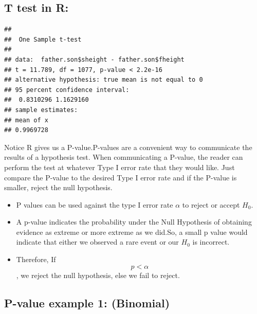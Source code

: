 \documentclass[]{article}
\newenvironment{Shaded}{\begin{snugshade}}{\end{snugshade}}
\newcommand{\KeywordTok}[1]{\textcolor[rgb]{0.13,0.29,0.53}{\textbf{#1}}}
\newcommand{\NormalTok}[1]{#1}
\newcommand{\OperatorTok}[1]{\textcolor[rgb]{0.81,0.36,0.00}{\textbf{#1}}}
\newcommand{\StringTok}[1]{\textcolor[rgb]{0.31,0.60,0.02}{#1}}
\providecommand{\tightlist}{%
  \setlength{\itemsep}{0pt}\setlength{\parskip}{0pt}}
\begin{document}
\hypertarget{t-test-in-r}{%
\subsection{T test in R:}\label{t-test-in-r}}

\begin{Shaded}
\end{Shaded}

\begin{verbatim}
## 
##  One Sample t-test
## 
## data:  father.son$sheight - father.son$fheight
## t = 11.789, df = 1077, p-value < 2.2e-16
## alternative hypothesis: true mean is not equal to 0
## 95 percent confidence interval:
##  0.8310296 1.1629160
## sample estimates:
## mean of x 
## 0.9969728
\end{verbatim}

Notice R gives us a P-value.P-values are a convenient way to communicate
the results of a hypothesis test. When communicating a P-value, the
reader can perform the test at whatever Type I error rate that they
would like. Just compare the P-value to the desired Type I error rate
and if the P-value is smaller, reject the null hypothesis.

\begin{itemize}
\tightlist
\item
  P values can be used against the type I error rate \(\alpha\) to
  reject or accept \(H_0\).
\item
  A p-value indicates the probability under the Null Hypothesis of
  obtaining evidence as extreme or more extreme as we did.So, a small p
  value would indicate that either we observed a rare event or our
  \(H_0\) is incorrect.
\item
  Therefore, If \[p < \alpha \], we reject the null hypothesis, else we
  fail to reject.
\end{itemize}

\hypertarget{p-value-example-1-binomial}{%
\subsection{P-value example 1:
(Binomial)}\label{p-value-example-1-binomial}}
\end{document}
